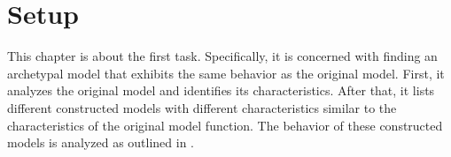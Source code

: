 \chapter{Setup}
\label{chap:setup}

This chapter is about the first task.
Specifically, it is concerned with finding an archetypal model that exhibits the same behavior as the original model.
First, it analyzes the original model and identifies its characteristics.
After that, it lists different constructed models with different characteristics similar to the characteristics of the original model function.
The behavior of these constructed models is analyzed as outlined in .



\clearpage



